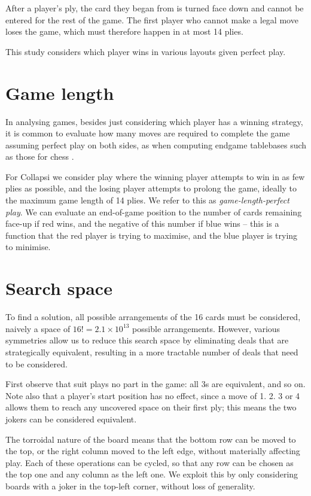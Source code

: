 \documentclass[a4paper, twocolumn]{article}
\begin{document}
After a player's ply, the card they began from is turned face down and cannot
be entered for the rest of the game. The first player who cannot make a legal
move loses the game, which must therefore happen in at most 14 plies.

This study considers which player wins in various layouts given perfect play.


\section{Game length}

In analysing games, besides just considering which player has a winning
strategy, it is common to evaluate how many moves are required to complete the
game assuming perfect play on both sides, as when computing endgame tablebases
such as those for chess \cite{endgame}.

For Collapsi we consider play where the winning player attempts to win in as few
plies as possible, and the losing player attempts to prolong the game, ideally
to the maximum game length of 14 plies. We refer to this as
\textit{game-length-perfect play}. We can evaluate an end-of-game position to
the number of cards remaining face-up if red wins, and the negative of this
number if blue wins -- this is a function that the red player is trying to
maximise, and the blue player is trying to minimise.


\section{Search space}

To find a solution, all possible arrangements of the 16 cards must be
considered, naively a space of $16! = 2.1 \times 10^{13}$ possible
arrangements. However, various symmetries allow us to reduce this search space by
eliminating deals that are strategically equivalent, resulting in a more tractable
number of deals that need to be considered.

First observe that suit plays no part in the game: all 3s are equivalent, and so
on. Note also that a player's start position has no effect, since a move of 1. 2. 3 or 4
allows them to reach any uncovered space on their first ply; this means the two
jokers can be considered equivalent.

The torroidal nature of the board means that the bottom row can be moved to the
top, or the right column moved to the left edge, without materially affecting
play. Each of these operations can be cycled, so that any row can be chosen as
the top one and any column as the left one. We exploit this by only considering
boards with a joker in the top-left corner, without loss of generality.
\end{document}
